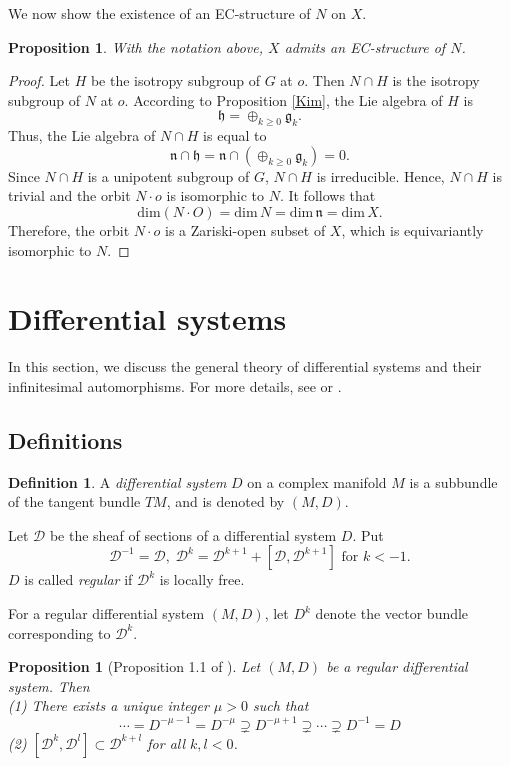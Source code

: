 \documentclass{amsart}
\newtheorem{proposition}[theorem]{Proposition}
\theoremstyle{definition}
\newtheorem{definition}{Definition}
\theoremstyle{remark}
\newcommand{\n}{\mathfrak{n}}
\begin{document}
We now show the existence of an EC-structure of $N$ on $X$.

\begin{proposition}
\label{existence}
With the notation above, $X$ admits an EC-structure of $N$.
\end{proposition}

\begin{proof}
Let $H$ be the isotropy subgroup of $G$ at $o$. Then $N \cap H$ is the isotropy subgroup of $N$ at $o$. According to Proposition \ref{Kim}, the Lie algebra of $H$ is  \[\mathfrak{h} = \oplus_{k \geq 0} \mathfrak{g}_k.\]
Thus, the Lie algebra of $N \cap H$ is equal to 
\[\n \cap \mathfrak{h} = \n \cap (\oplus_{k \geq 0} \mathfrak{g}_k) = 0.\]
Since $N \cap H$ is a unipotent subgroup of $G$, $N \cap H$ is irreducible. Hence, $N \cap H$ is trivial and the orbit $N\cdot o$ is isomorphic to $N$. It follows that 
\[\mathrm{dim}(N\cdot O) =\mathrm{dim}\, N = \mathrm{dim}\, \n = \mathrm{dim}\, X.\]
Therefore, the orbit \(N\cdot o\) is a Zariski-open subset of \(X\), which is equivariantly isomorphic to \(N\).
\end{proof}


\section{Differential systems}
In this section, we discuss the general theory of differential systems and their infinitesimal automorphisms. For more details, see \cite{T} or \cite{Y}. 

\subsection{Definitions}

\begin{definition}
A {\it differential system} \(D\) on a complex manifold \(M\) is a subbundle of the tangent bundle \(TM\), and is denoted by \((M, D)\).

Let \(\mathcal{D}\) be the sheaf of sections of a differential system \(D\). Put 
\[\mathcal{D}^{-1} = \mathcal{D}, \; \mathcal{D}^{k} = \mathcal{D}^{k+1} + [\mathcal{D}, \mathcal{D}^{k+1}] \text{ for }  k < -1.\]
\(D\) is called {\it regular} if \(\mathcal{D}^k\) is locally free.
\end{definition}


For a regular differential system $(M, D)$, let $D^k$ denote the vector bundle corresponding to \(\mathcal{D}^k\).


\begin{proposition}[Proposition 1.1 of \cite{T}]
\label{}
Let $(M, D)$ be a regular differential system. Then\\
(1) There exists a unique integer $\mu > 0$ such that 
\[
\cdots =D^{-\mu -1} = D^{-\mu} \supsetneq D^{-\mu + 1} \supsetneq \cdots \supsetneq D^{-1} = D
\]
(2) $[\mathcal{D}^k, \mathcal{D}^l] \subset \mathcal{D}^{k+l}$ for all $k,l < 0$.
\end{proposition}
\end{document}
